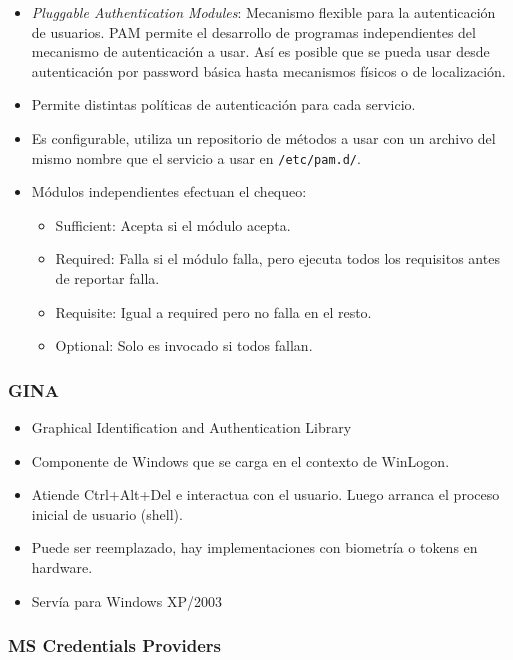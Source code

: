 \begin{itemize}
	\item \textit{Pluggable Authentication Modules}: Mecanismo flexible para la autenticación de usuarios. PAM
	permite el desarrollo de programas independientes del mecanismo de autenticación a usar. Así es posible que
	se pueda usar desde autenticación por password básica hasta mecanismos físicos o de localización.
	\item Permite distintas políticas de autenticación para cada servicio.
	\item Es configurable, utiliza un repositorio de métodos a usar con un archivo del mismo nombre que el servicio
	a usar en \texttt{/etc/pam.d/}.
	\item Módulos independientes efectuan el chequeo: \begin{itemize}
		\item Sufficient: Acepta si el módulo acepta.
		\item Required: Falla si el módulo falla, pero ejecuta todos los requisitos antes de reportar falla.
		\item Requisite: Igual a required pero no falla en el resto.
		\item Optional: Solo es invocado si todos fallan.
	\end{itemize}
\end{itemize}

\subsubsection{GINA}

\begin{itemize}
	\item Graphical Identification and Authentication Library
	\item Componente de Windows que se carga en el contexto de WinLogon. 
	\item Atiende Ctrl+Alt+Del e interactua con el usuario. Luego arranca el proceso inicial de usuario (shell).
	\item Puede ser reemplazado, hay implementaciones con biometría o tokens en hardware.
	\item Servía para Windows XP/2003
\end{itemize}

\subsubsection{MS Credentials Providers}

